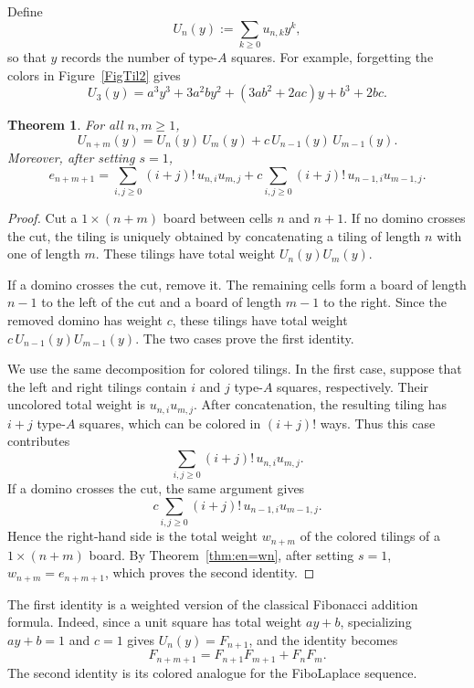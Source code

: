 \documentclass[11pt]{amsart}
\theoremstyle{plain}
\numberwithin{equation}{section}
\newtheorem{theorem}[thm]{Theorem}
\begin{document}
Define
\[
U_n(y):=\sum_{k\ge 0} u_{n,k} y^k,
\]
so that $y$ records the number of type-$A$ squares. For example, forgetting the colors in Figure~\ref{FigTil2} gives
\[
U_3(y)=a^3y^3 + 3a^2by^2 + (3ab^2+2ac)y + b^3 + 2bc.
\]

\begin{theorem}\label{teor:addition-formula}
For all $n,m\ge 1$,
\begin{equation*}
U_{n+m}(y)=U_n(y)\,U_m(y)+c\,U_{n-1}(y)\,U_{m-1}(y).
\end{equation*}
Moreover, after setting $s=1$,
\[
e_{n+m+1}
=
\sum_{i,j\geq 0}
(i+j)!\,u_{n,i}u_{m,j}
+
c\sum_{i,j\geq 0}
(i+j)!\,u_{n-1,i}u_{m-1,j}.
\]
\end{theorem}

\begin{proof}
Cut a $1\times(n+m)$ board between cells $n$ and $n+1$. If no domino crosses the cut, the tiling is uniquely obtained by concatenating a tiling of length $n$ with one of length $m$. These
tilings have total weight  $U_n(y)U_m(y)$. 

If a domino crosses the cut, remove it. The remaining cells form a
board of length $n-1$ to the left of the cut and a board of length
$m-1$ to the right. Since the removed domino has weight $c$, these
tilings have total weight $c\,U_{n-1}(y)U_{m-1}(y)$. The two cases prove the first identity.


We use the same decomposition for colored tilings. In the first case,
suppose that the left and right tilings contain $i$ and $j$ type-$A$ squares, respectively. Their uncolored total weight is $u_{n,i}u_{m,j}$. After concatenation, the resulting tiling has $i+j$ type-$A$ squares, which can be colored in $(i+j)!$ ways.
Thus this case contributes
\[
\sum_{i,j\geq 0}(i+j)!\,u_{n,i}u_{m,j}.
\]
If a domino crosses the cut, the same argument gives
\[
c\sum_{i,j\geq 0}
(i+j)!\,u_{n-1,i}u_{m-1,j}.
\]
Hence the right-hand side is the total weight $w_{n+m}$ of the colored
tilings of a $1\times(n+m)$ board.  By Theorem~\ref{thm:en=wn}, after setting $s=1$,
$w_{n+m}=e_{n+m+1}$, which proves the second identity.
\end{proof}

The first identity is a weighted version of the classical Fibonacci addition formula. Indeed, since a unit square has total weight $ay+b$, specializing  $ay+b=1$ and $c=1$ gives $U_n(y)=F_{n+1}$, and the
identity becomes
\[
F_{n+m+1}=F_{n+1}F_{m+1}+F_nF_m.
\]
The second identity is its colored analogue for the FiboLaplace sequence.
\end{document}
